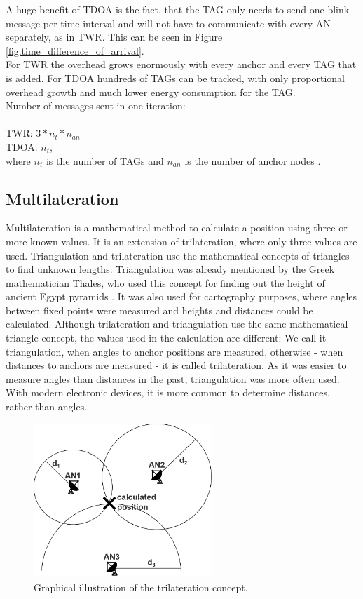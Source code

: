 A huge benefit of TDOA is the fact, that the TAG only needs to send one blink message per time interval and will not have to communicate with every AN separately, as in TWR. This can be seen in Figure \ref{fig:time_difference_of_arrival}.\\
\noindent\hspace*{5mm}%
For TWR the overhead grows enormously with every anchor and every TAG that is added. For TDOA hundreds of TAGs can be tracked, with only proportional overhead growth and much lower energy consumption for the TAG.\\
Number of messages sent in one iteration:\\
\\
TWR:  $3 * n_{t} * n_{an}$\\
TDOA:  $n_{t}$,\\
where $n_{t}$ is the number of TAGs and $n_{an}$ is the number of anchor nodes \cite{SewioTDOA}.

\subsection{Multilateration}
Multilateration is a mathematical method to calculate a position using three or more known values. It is an extension of trilateration, where only three values are used. Triangulation and trilateration use the mathematical concepts of triangles to find unknown lengths. Triangulation was already mentioned by the Greek mathematician Thales, who used this concept for finding out the height of ancient Egypt pyramids \cite{thales}. It was also used for cartography purposes, where angles between fixed points were measured and heights and distances could be calculated. 
Although trilateration and triangulation use the same mathematical triangle concept, the values used in the calculation are different: We call it triangulation, when angles to anchor positions are measured, otherwise - when distances to anchors are measured - it is called trilateration.
As it was easier to measure angles than distances in the past, triangulation was more often used. With modern electronic devices, it is more common to determine distances, rather than angles. 

\begin{figure}[th]
\centering
\includegraphics[width=0.6\textwidth]{Figures/trilateration}
\decoRule
\caption[Trilateration]{Graphical illustration of the trilateration concept.}
\label{fig:trilateration}
\end{figure}

